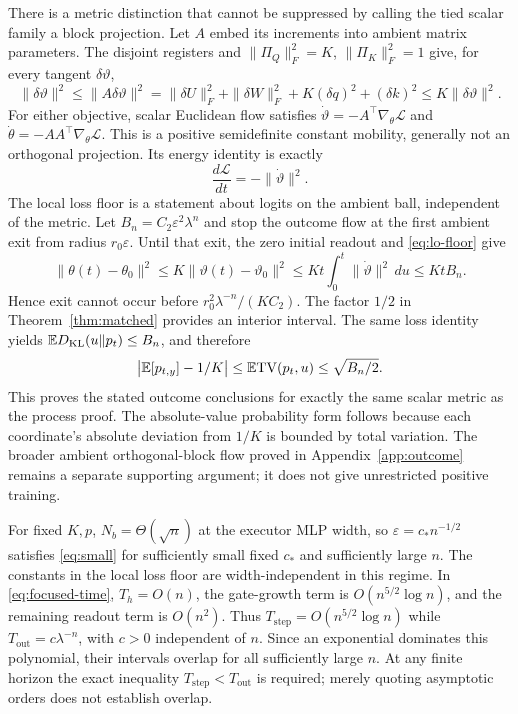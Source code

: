 There is a metric distinction that cannot be suppressed by calling the tied scalar family a block projection. Let $A$ embed its increments into ambient matrix parameters. The disjoint registers and
$\|\Pi_Q\|_F^2=K$, $\|\Pi_K\|_F^2=1$ give, for every tangent $\delta\vartheta$,
\begin{equation}\label{eq:metric-comparison}
\|\delta\vartheta\|^2\le\|A\delta\vartheta\|^2
=\|\delta U\|_F^2+\|\delta W\|_F^2+K(\delta q)^2+(\delta k)^2
\le K\|\delta\vartheta\|^2.
\end{equation}
For either objective, scalar Euclidean flow satisfies $\dot\vartheta=-A^\top\nabla_\theta\mathcal L$ and $\dot\theta=-AA^\top\nabla_\theta\mathcal L$. This is a positive semidefinite constant mobility, generally not an orthogonal projection. Its energy identity is exactly
\[
\frac{d\mathcal L}{dt}=-\|\dot\vartheta\|^2.
\]
The local loss floor is a statement about logits on the ambient ball, independent of the metric. Let $B_n=C_2\varepsilon^2\lambda^n$ and stop the outcome flow at the first ambient exit from radius $r_0\varepsilon$. Until that exit, the zero initial readout and \cref{eq:lo-floor} give
\[
\|\theta(t)-\theta_0\|^2\le K\|\vartheta(t)-\vartheta_0\|^2
\le Kt\int_0^t\|\dot\vartheta\|^2\,du\le KtB_n.
\]
Hence exit cannot occur before $r_0^2\lambda^{-n}/(KC_2)$. The factor $1/2$ in Theorem~\ref{thm:matched} provides an interior interval. The same loss identity yields $\mathbb ED_{\mathrm{KL}}(u\|p_t)\le B_n$, and therefore
\[
\big|\mathbb E[p_{t,y}]-1/K\big|\le\mathbb E\mathrm{TV}(p_t,u)
\le\sqrt{B_n/2}.
\]
This proves the stated outcome conclusions for exactly the same scalar metric as the process proof. The absolute-value probability form follows because each coordinate's absolute deviation from $1/K$ is bounded by total variation. The broader ambient orthogonal-block flow proved in Appendix~\ref{app:outcome} remains a separate supporting argument; it does not give unrestricted positive training.

For fixed $K,p$, $N_b=\Theta(\sqrt n)$ at the executor MLP width, so $\varepsilon=c_*n^{-1/2}$ satisfies \cref{eq:small} for sufficiently small fixed $c_*$ and sufficiently large $n$. The constants in the local loss floor are width-independent in this regime. In \cref{eq:focused-time}, $T_h=O(n)$, the gate-growth term is $O(n^{5/2}\log n)$, and the remaining readout term is $O(n^2)$. Thus $T_{\mathrm{step}}=O(n^{5/2}\log n)$ while $T_{\mathrm{out}}=c\lambda^{-n}$, with $c>0$ independent of $n$. Since an exponential dominates this polynomial, their intervals overlap for all sufficiently large $n$. At any finite horizon the exact inequality $T_{\mathrm{step}}<T_{\mathrm{out}}$ is required; merely quoting asymptotic orders does not establish overlap.


